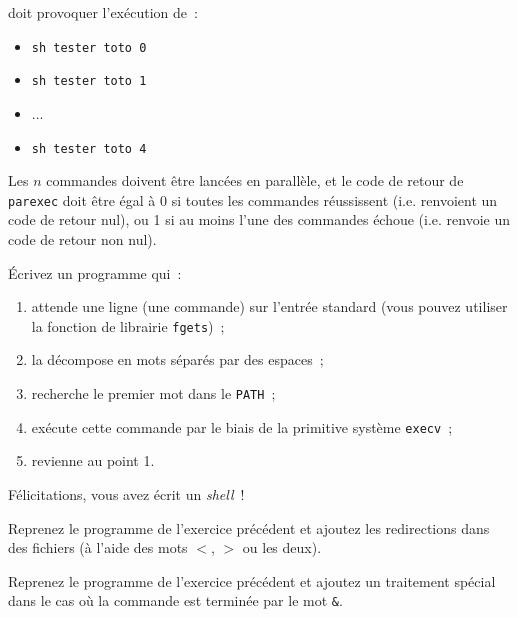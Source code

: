 doit provoquer l'exécution de~:

\begin {itemize}
    \item \texttt {sh tester toto 0}
    \item \texttt {sh tester toto 1}
    \item ...
    \item \texttt {sh tester toto 4}
\end {itemize}

Les $n$ commandes doivent être lancées en parallèle, et le code de
retour de \texttt {parexec} doit être égal à 0 si toutes les commandes
réussissent (i.e. renvoient un code de retour nul), ou 1 si au moins
l'une des commandes échoue (i.e. renvoie un code de retour non nul).


\question

Écrivez un programme qui~:

\begin {enumerate}
    \item attende une ligne (une commande) sur l'entrée standard (vous
	pouvez utiliser la fonction de librairie {\tt fgets})~;

    \item la décompose en mots séparés par des espaces~;

    \item recherche le premier mot dans le {\tt PATH}~;

    \item exécute cette commande par le biais de la primitive système
	{\tt execv}~;
    
    \item revienne au point 1.

\end {enumerate}

Félicitations, vous avez écrit un {\em shell}~!


\question

Reprenez le programme de l'exercice précédent et ajoutez les
redirections dans des fichiers (à l'aide des mots $<$, $>$ ou les
deux).


\question
\label{q:minishell}

Reprenez le programme de l'exercice précédent et ajoutez un traitement
spécial dans le cas où la commande est terminée par le mot \verb:&:.


